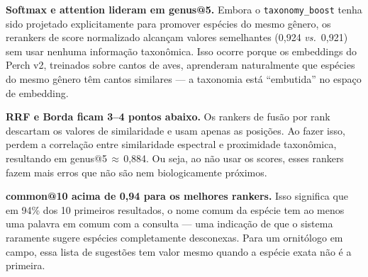\documentclass[12pt]{article}
\begin{document}
\textbf{Softmax e attention lideram em genus@5.} Embora o
\texttt{taxonomy\_boost} tenha sido projetado explicitamente para promover
espécies do mesmo gênero, os rerankers de score normalizado alcançam valores
semelhantes (0,924 \textit{vs.}\ 0,921) sem usar nenhuma informação taxonômica.
Isso ocorre porque os embeddings do Perch v2, treinados sobre cantos de aves,
aprenderam naturalmente que espécies do mesmo gênero têm cantos similares ---
a taxonomia está ``embutida'' no espaço de embedding.

\textbf{RRF e Borda ficam 3--4 pontos abaixo.} Os rankers de fusão por rank
descartam os valores de similaridade e usam apenas as posições. Ao fazer isso,
perdem a correlação entre similaridade espectral e proximidade taxonômica,
resultando em genus@5\,$\approx$\,0,884. Ou seja, ao não usar os scores, esses
rankers fazem mais erros que não são nem biologicamente próximos.

\textbf{common@10 acima de 0,94 para os melhores rankers.} Isso significa que
em 94\% dos 10 primeiros resultados, o nome comum da espécie tem ao menos uma
palavra em comum com a consulta --- uma indicação de que o sistema raramente
sugere espécies completamente desconexas. Para um ornitólogo em campo, essa
lista de sugestões tem valor mesmo quando a espécie exata não é a primeira.


\end{document}
